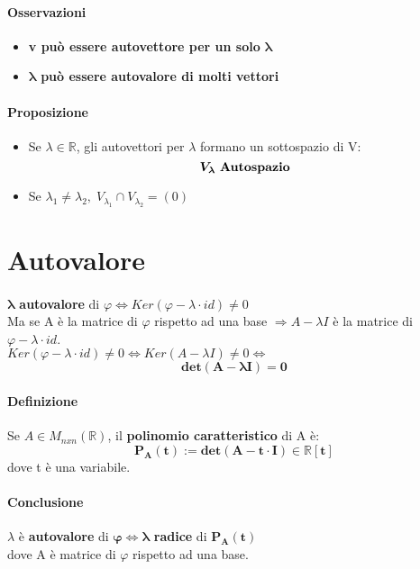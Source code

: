 \documentclass[a4paper, 12pt]{report}
\begin{document}
        \paragraph{Osservazioni}
        \begin{itemize}
            \item \textbf{v può essere autovettore per un solo} $\boldsymbol{\lambda}$
            \item $\boldsymbol{\lambda}$ \textbf{può essere autovalore di molti vettori} 
        \end{itemize}
        \paragraph{Proposizione}
        \begin{itemize}
            \item Se $\lambda \in \mathbb{R}$, gli autovettori per $\lambda$ formano un sottospazio di V:$$\boldsymbol{V_{\lambda}} \text{ \textbf{Autospazio}}$$
            \item Se $\lambda_1 \neq \lambda_2, \; V_{\lambda_1} \cap V_{\lambda_2}=(0)$
        \end{itemize}
        \section{Autovalore}
            \paragraph{}$\boldsymbol{\lambda}$ \textbf{autovalore} di $\varphi \Leftrightarrow Ker(\varphi-\lambda\cdot id)\neq 0$
            \\Ma se A è la matrice di $\varphi$ rispetto ad una base $\Rightarrow
            A-\lambda I$ è la matrice di $\varphi-\lambda \cdot id$.\\
            $Ker(\varphi-\lambda \cdot id)\neq 0 \Leftrightarrow Ker(A-\lambda I)\neq 0 \Leftrightarrow$ $$\boldsymbol{det(A-\lambda I)=0}$$
            \paragraph{Definizione}Se $A \in M_{nxn} (\mathbb{R})$, il \textbf{polinomio caratteristico} di A è:
            $$\boldsymbol{P_A(t):= det(A-t\cdot I) \in \mathbb{R}[t]}$$
            dove t è una variabile.
            \paragraph{Conclusione}$\lambda$ è \textbf{autovalore} di $\boldsymbol{\varphi} \Leftrightarrow \boldsymbol{\lambda}$ \textbf{radice} di $\boldsymbol{P_A(t)}$\\
            dove A è matrice di $\varphi$ rispetto ad una base.
\end{document}
